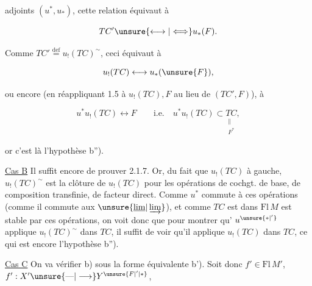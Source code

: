 adjoints $(u^*,u_*)$, cette relation équivaut à

\[
TC'\unsure{\longleftrightarrow|\Longleftrightarrow}u_*(F).
\]

Comme $TC'\overset{\mathrm{def}}{=}u_!(TC)^{\sim}$, ceci équivaut à

\[
u_!(TC)\longleftrightarrow u_*(\unsure{F}),
\]

ou encore (en réappliquant 1.5 à $u_!(TC),F$
au lieu de $(TC',F)$), à

\[
u^*u_!(TC)\longleftrightarrow F\qquad\text{i.e.}\quad
u^*u_!(TC)\subset\underset{\substack{\parallel\\ F^*}}{TC},
\]

or c'est là l'hypothèse  b'').

\uline{Cas B} Il suffit encore de prouver
2.1.7. Or, du fait que $u_!(TC)$  
  à gauche,
$u_!(TC)^{\sim}$ est la clôture de $u_!(TC)$ pour les
opérations de cochgt. de base, de composition
transfinie, de facteur direct. Comme
$u^*$ commute à  ces opérations (comme
il commute aux  $\unsure{\underline{\lim}|\varinjlim}$), et  comme
$TC$ est dans $\mathrm{Fl}\,M$ est stable par ces opérations,
on voit donc que pour montrer qu'
$u^{\unsure{*|'}}$ applique $u_!(TC)^{\sim}$ dans $TC$, il suffit de
voir qu'il applique $u_!(TC)$ dans $TC$, ce qui
est encore l'hypothèse b'').

\uline{Cas C} On va vérifier b) sous la forme
équivalente b'). Soit donc $f'\in\mathrm{Fl}\,M'$,
 $f':X'\unsure{\text{---}|\longrightarrow}Y^{\unsure{F|'|*}}$,
